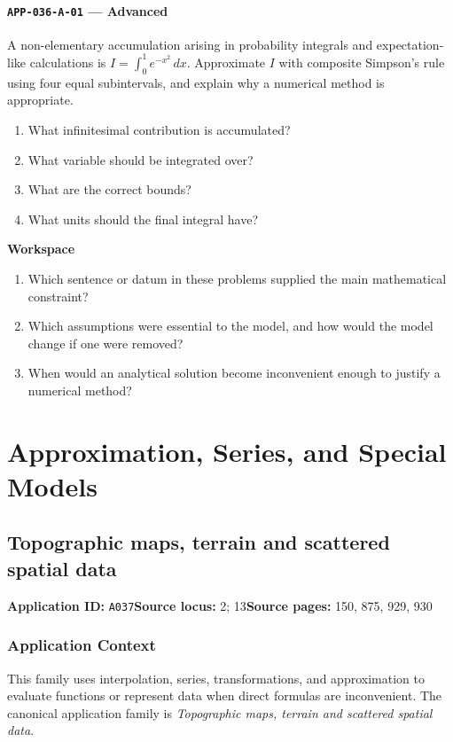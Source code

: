 \documentclass[11pt]{book}
\newcommand{\pid}[1]{\texttt{#1}}
\newcommand{\workspace}{\par\vspace{0.7in}\hrulefill\par\vspace{0.55in}\hrulefill\par}
\begin{document}
\subsection*{\pid{APP-036-A-01} — Advanced}
\begin{problembox}
A non-elementary accumulation arising in probability integrals and expectation-like calculations is $I=\int_0^1 e^{-x^2}\,dx$. Approximate $I$ with composite Simpson's rule using four equal subintervals, and explain why a numerical method is appropriate.
\end{problembox}
\begin{promptbox}\begin{enumerate}
\item What infinitesimal contribution is accumulated?
\item What variable should be integrated over?
\item What are the correct bounds?
\item What units should the final integral have?
\end{enumerate}\end{promptbox}
\textbf{Workspace}\workspace
\begin{reflectionbox}\begin{enumerate}
\item Which sentence or datum in these problems supplied the main mathematical constraint?
\item Which assumptions were essential to the model, and how would the model change if one were removed?
\item When would an analytical solution become inconvenient enough to justify a numerical method?
\end{enumerate}\end{reflectionbox}
\part{Approximation, Series, and Special Models}
\chapter{Topographic maps, terrain and scattered spatial data}\label{app:A037}
\textbf{Application ID:} \pid{A037}\quad \textbf{Source locus:} 2; 13\quad \textbf{Source pages:} 150, 875, 929, 930
\section*{Application Context}
This family uses interpolation, series, transformations, and approximation to evaluate functions or represent data when direct formulas are inconvenient. The canonical application family is \emph{Topographic maps, terrain and scattered spatial data}.
\end{document}
